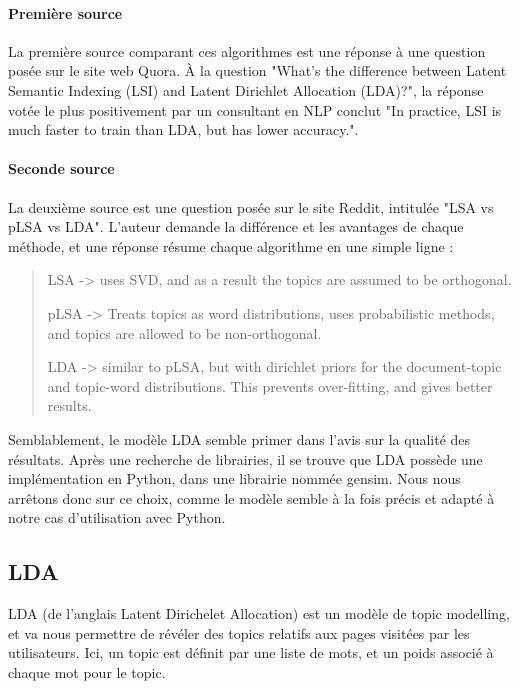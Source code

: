 			\paragraph{Première source} 

				La première source comparant ces algorithmes est une réponse à une question posée sur le site web Quora\cite{quora-topicmodel}. À la question "What's the difference between Latent Semantic Indexing (LSI) and Latent Dirichlet Allocation (LDA)?", la réponse votée le plus positivement par un consultant en NLP conclut "In practice, LSI is much faster to train than LDA, but has lower accuracy.".

			\paragraph{Seconde source}

				La deuxième source est une question posée sur le site Reddit, intitulée "LSA vs pLSA vs LDA"\cite{reddit-topicmodel}. L'auteur demande la différence et les avantages de chaque méthode, et une réponse résume chaque algorithme en une simple ligne :
				\begin{quote}
LSA -> uses SVD, and as a result the topics are assumed to be orthogonal.

pLSA -> Treats topics as word distributions, uses probabilistic methods, and topics are allowed to be non-orthogonal.

LDA -> similar to pLSA, but with dirichlet priors for the document-topic and topic-word distributions. This prevents over-fitting, and gives better results.
				\end{quote}

				Semblablement, le modèle LDA semble primer dans l'avis sur la qualité des résultats. Après une recherche de librairies, il se trouve que LDA possède une implémentation en Python, dans une librairie nommée gensim. Nous nous arrêtons donc sur ce choix, comme le modèle semble à la fois précis et adapté à notre cas d'utilisation avec Python.

	\subsection{LDA}\label{analyse-lda}

		LDA (de l'anglais Latent Dirichelet Allocation) est un modèle de topic modelling, et va nous permettre de révéler des topics relatifs aux pages visitées par les utilisateurs. Ici, un topic est définit par une liste de mots, et un poids associé à chaque mot pour le topic.

